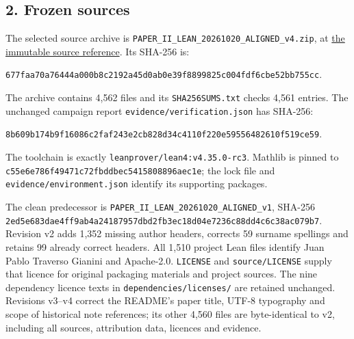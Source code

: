 \documentclass[english,11pt,a4paper]{article}
\begin{document}
\subsection{2. Frozen sources}\label{frozen-sources}

The selected source archive is \texttt{PAPER\_\allowbreak{}II\_\allowbreak{}LEA\allowbreak{}N\_\allowbreak{}20261020\_\allowbreak{}A\allowbreak{}LIGNED\_\allowbreak{}v4.\allowbreak{}zi\allowbreak{}p}, at \href{https://github.com/jtraverso/nash-williams-triangle-decompositions/blob/e14248179ae6c9d8c0b24f4541e5087afca6e5c4/archives/PAPER_II_LEAN_20261020_ALIGNED_v4.zip}{the immutable source reference}. Its SHA-256 is:

\texttt{677faa70\allowbreak{}a764\allowbreak{}44a0\allowbreak{}00b8c219\allowbreak{}\allowbreak{}2a45d0ab\allowbreak{}0e39\allowbreak{}f889\allowbreak{}9825c004\allowbreak{}\allowbreak{}fdf6cbe5\allowbreak{}2bb7\allowbreak{}55cc\allowbreak{}}.

The archive contains 4,562 files and its \texttt{SHA256SUMS.\allowbreak{}t\allowbreak{}xt} checks 4,561 entries. The unchanged campaign report \texttt{evidence/\allowbreak{}ver\allowbreak{}ification.\allowbreak{}js\allowbreak{}on} has SHA-256:

\texttt{8b609b17\allowbreak{}4b9f\allowbreak{}1608\allowbreak{}6c2faf24\allowbreak{}\allowbreak{}3e2cb828\allowbreak{}d34c\allowbreak{}4110\allowbreak{}f220e595\allowbreak{}\allowbreak{}56482610\allowbreak{}f519\allowbreak{}ce59\allowbreak{}}.

The toolchain is exactly \texttt{leanprover/\allowbreak{}l\allowbreak{}ean4:v4.\allowbreak{}35.\allowbreak{}0\allowbreak{}-\allowbreak{}rc3}. Mathlib is pinned to \texttt{c55e6e78\allowbreak{}6f49\allowbreak{}471c\allowbreak{}72fbddbe\allowbreak{}\allowbreak{}c5415808\allowbreak{}896a\allowbreak{}ec1e\allowbreak{}}; the lock file and \texttt{evidence/\allowbreak{}env\allowbreak{}ironment.\allowbreak{}jso\allowbreak{}n} identify its supporting packages.

The clean predecessor is \texttt{PAPER\_\allowbreak{}II\_\allowbreak{}LEA\allowbreak{}N\_\allowbreak{}20261020\_\allowbreak{}A\allowbreak{}LIGNED\_\allowbreak{}v1}, SHA-256 \texttt{2ed5e683\allowbreak{}dae4\allowbreak{}ff9a\allowbreak{}b4a24187\allowbreak{}\allowbreak{}957dbd2f\allowbreak{}b3ec\allowbreak{}18d0\allowbreak{}4e7236c8\allowbreak{}\allowbreak{}8dd4c6c3\allowbreak{}8ac0\allowbreak{}79b7\allowbreak{}}. Revision v2 adds 1,352 missing author headers, corrects 59 surname spellings and retains 99 already correct headers. All 1,510 project Lean files identify Juan Pablo Traverso Gianini and Apache-2.0. \texttt{LICENSE} and \texttt{source/\allowbreak{}LICEN\allowbreak{}SE} supply that licence for original packaging materials and project sources. The nine dependency licence texts in \texttt{dependencies\allowbreak{}/\allowbreak{}licenses/\allowbreak{}} are retained unchanged. Revisions v3--v4 correct the README's paper title, UTF-8 typography and scope of historical note references; its other 4,560 files are byte-identical to v2, including all sources, attribution data, licences and evidence.
\end{document}
